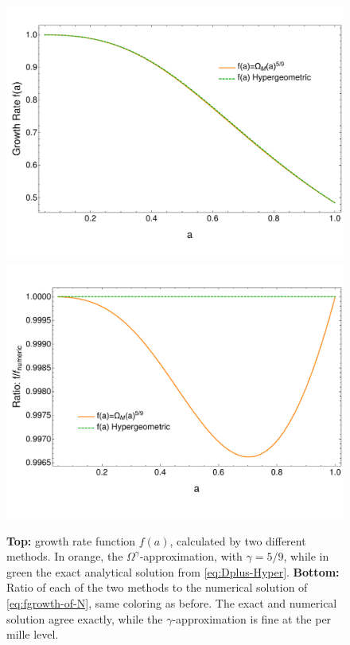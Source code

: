 \begin{figure}[tbph]
	\centering{}
	\includegraphics[width=0.6\linewidth]{Figures/fGrowthRate-ofa-Approx-vs-ExactHyper}\\
	\includegraphics[width=0.6\linewidth]{Figures/fGrowthRate-Ratio-ofa-Approx-vs-ExactHyper-RatioToNumeric}
	\caption[Growth rate comparison for CDM]{
	\textbf{Top:} growth rate function $f(a)$, calculated by two different methods. In orange, the $\Omega^\gamma$-approximation, with $\gamma=5/9$, while
	in green the exact analytical solution from \cref{eq:Dplus-Hyper}.
    \textbf{Bottom:} Ratio of each of the two methods to the numerical solution of \cref{eq:fgrowth-of-N}, same coloring as before. The exact and numerical solution
agree exactly, while the $\gamma$-approximation is fine at the per mille level.}
	\label{fig:fgrowthrate-ofa-approx-vs-exacthyper}
\end{figure}



